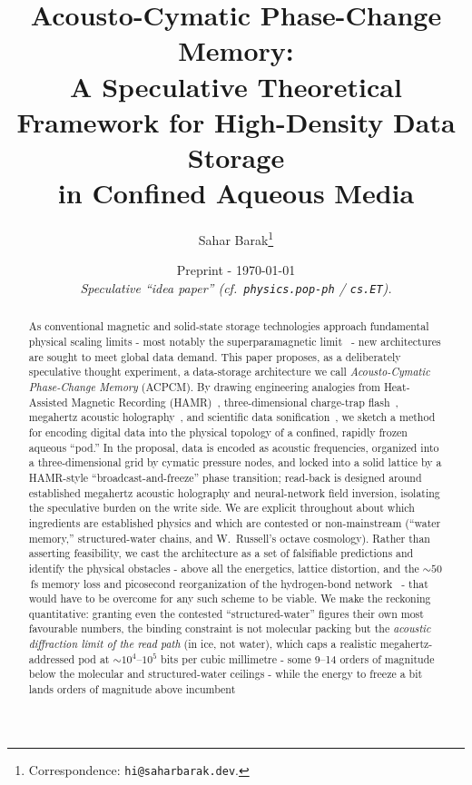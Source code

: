 \documentclass[11pt]{article}
\title{\bfseries\color{acpcmblue}\Large Acousto-Cymatic Phase-Change Memory:\\[2pt]
A Speculative Theoretical Framework for High-Density Data Storage\\ in Confined Aqueous Media}
\author{Sahar Barak\thanks{Correspondence: \texttt{hi@saharbarak.dev}.}}
\affil{Independent Researcher}
\date{\small Preprint - \today \\[2pt] \emph{Speculative ``idea paper'' (cf.\ \texttt{physics.pop-ph} / \texttt{cs.ET}).}}
\theoremstyle{definition}
\begin{document}
\maketitle
\thispagestyle{plain}

\begin{abstract}
\noindent
As conventional magnetic and solid-state storage technologies approach fundamental
physical scaling limits - most notably the superparamagnetic limit~\cite{charap1997,wellermoser1999} - new
architectures are sought to meet global data demand. This paper proposes, as a
deliberately speculative thought experiment, a data-storage architecture we call
\emph{Acousto-Cymatic Phase-Change Memory} (ACPCM). By drawing engineering analogies
from Heat-Assisted Magnetic Recording (HAMR)~\cite{kryder2008hamr}, three-dimensional
charge-trap flash~\cite{white2000sonos,tanaka2007bics}, megahertz acoustic
holography~\cite{melde2016holograms}, and scientific data
sonification~\cite{hermann2011handbook}, we sketch a method for encoding digital data
into the physical topology of a confined, rapidly frozen aqueous ``pod.'' In the
proposal, data is encoded as acoustic frequencies, organized into a three-dimensional
grid by cymatic pressure nodes, and locked into a solid lattice by a HAMR-style
``broadcast-and-freeze'' phase transition; read-back is designed around established
megahertz acoustic holography and neural-network field inversion, isolating the
speculative burden on the write side. We are explicit throughout about which
ingredients are established physics and which are contested or non-mainstream
(``water memory,'' structured-water chains, and W.~Russell's octave cosmology). Rather
than asserting feasibility, we cast the architecture as a set of falsifiable predictions
and identify the physical obstacles - above all the energetics, lattice distortion, and
the ${\sim}50$\,fs memory loss and picosecond reorganization of the hydrogen-bond
network~\cite{cowan2005water} - that would have to be overcome for any such scheme to be
viable. We make the reckoning quantitative: granting even the contested ``structured-water''
figures their own most favourable numbers, the binding constraint is not molecular packing
but the \emph{acoustic diffraction limit of the read path} (in ice, not water), which caps a
realistic megahertz-addressed pod at ${\sim}10^{4}$--$10^{5}$ bits per cubic millimetre -
some 9--14 orders of magnitude below the molecular and structured-water ceilings - while the
energy to freeze a bit lands orders of magnitude above incumbent

\end{abstract}
\end{document}
